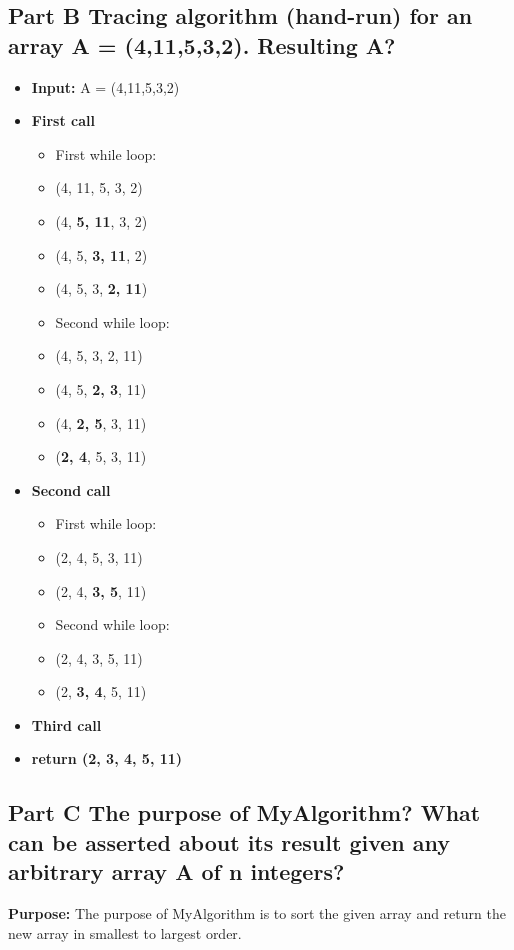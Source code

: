 \documentclass{article}
\begin{document}
\subsection*{Part B\: Tracing algorithm (hand-run) for an array A = (4,11,5,3,2). Resulting A?}
\begin{itemize}
	\item \textbf{Input: } A = (4,11,5,3,2)
	\item\textbf{First call}
		\begin{itemize}
		\item[] First while loop:
		\item[] (4, 11, 5, 3, 2)
		\item[] (4, \textbf{5, 11}, 3, 2)
		\item[] (4, 5, \textbf{3, 11}, 2)
		\item[] (4, 5, 3, \textbf{2, 11})

		\item[] Second while loop:
		\item[] (4, 5, 3, 2, 11)
		\item[] (4, 5, \textbf{2, 3}, 11)
		\item[] (4, \textbf{2, 5}, 3, 11)
		\item[] (\textbf{2, 4}, 5, 3, 11)

		\end{itemize}
	\item \textbf{Second call}
		\begin{itemize}
		\item[] First while loop:
		\item[] (2, 4, 5, 3, 11)
		\item[] (2, 4, \textbf{3, 5}, 11)
		
		\item[] Second while loop:
		\item[] (2, 4, 3, 5, 11)
		\item[] (2, \textbf{3, 4}, 5, 11)
				
		\end{itemize}
	\item \textbf{Third call}
	\item \textbf{return (2, 3, 4, 5, 11)}
\end{itemize}

\subsection*{Part C\: The purpose of MyAlgorithm? What can be asserted about its result given any arbitrary array A of n integers?}
\textbf{Purpose: } The purpose of MyAlgorithm is to sort the given array and return the new array in smallest to largest order.
\end{document}
